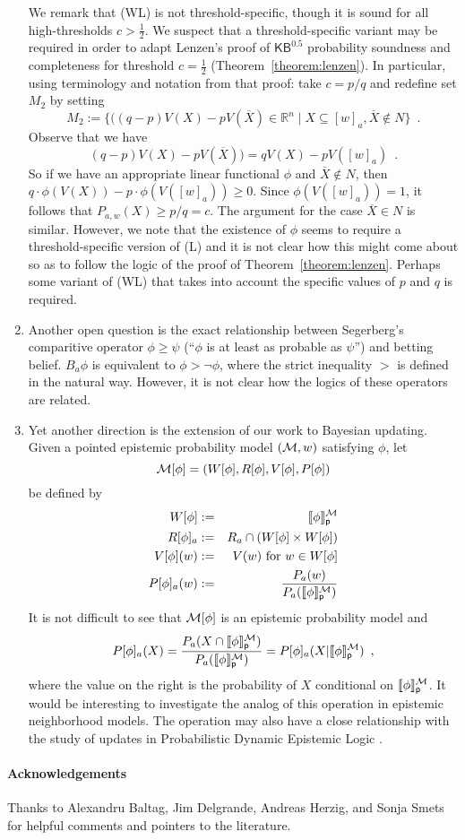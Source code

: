 \documentclass[12pt]{article}
\theoremstyle{definition}
\newcommand{\M}{{\cal M}}      %
\newcommand{\KBeq}{{\mathsf{KB}^{\mathsf{0.5}}}}       %
\newcommand{\semp}[1]{\llbracket{#1}\rrbracket_{\mathsf{p}}} %
\begin{document}
\begin{enumerate}
We remark that (WL) is not threshold-specific, though it is sound for
all high-thresholds $c>\frac 12$.  We suspect that a
threshold-specific variant may be required in order to adapt Lenzen's
proof of $\KBeq$ probability soundness and completeness for threshold
$c=\frac 12$ (Theorem~\ref{theorem:lenzen}).  In particular, using
terminology and notation from that proof: take $c=p/q$ and redefine
set $M_2$ by setting
\[
M_2:= \{((q-p) V(X)- p V(\overline X)\in\mathbb{R}^n\mid
X\subseteq[w]_a,\overline{X}\notin N\}\enspace.
\]
Observe that we have
\[
(q-p) V(X)- p V(\overline X)) =
qV(X)-pV([w]_a)\enspace.
\]
So if we have an appropriate linear functional $\phi$ and
$\overline{X}\notin N$, then
$q\cdot\phi(V(X))-p\cdot\phi(V([w]_a))\geq 0$.  Since
$\phi(V([w]_a))=1$, it follows that $P_{a,w}(X)\geq p/q=c$.  The
argument for the case $\overline{X}\in N$ is similar.  However, we
note that the existence of $\phi$ seems to require a
threshold-specific version of (L) and it is not clear how this might
come about so as to follow the logic of the proof of
Theorem~\ref{theorem:lenzen}.  Perhaps some variant of (WL) that takes
into account the specific values of $p$ and $q$ is required.

\item Another open question is the exact relationship between
  Segerberg's comparitive operator $\phi\geq\psi$ (``$\phi$ is at
  least as probable as $\psi$'') \cite{Segerberg1971:qpiams} and
  betting belief.  $B_a\phi$ is equivalent to $\phi>\lnot\phi$, where
  the strict inequality $>$ is defined in the natural way.  However,
  it is not clear how the logics of these operators are related.

\item Yet another direction is the extension of our work to Bayesian
  updating.  Given a pointed epistemic probability model $(\M,w)$
  satisfying $\phi$, let
\[
\M[\phi]=(W[\phi],R[\phi],V[\phi],P[\phi])
\]
be defined by
\begin{eqnarray*}
  W[\phi] &:=& \semp{\phi}^\M \\
  R[\phi]_a &:=& R_a \cap (W[\phi]\times W[\phi]) \\
  V[\phi](w) &:=& V(w) \text{ for } w\in W[\phi] \\
  P[\phi]_a(w) &:=&
    \frac{ P_a(w) }{ P_a(\semp{\phi}^\M) }
\end{eqnarray*}
It is not difficult to see that $\M[\phi]$ is an epistemic probability model and
\[
P[\phi]_a(X) =
\frac{ P_a(X\cap\semp{\phi}^\M) }{ P_a(\semp{\phi}^\M) } = 
P[\phi]_a(X|\semp{\phi}^\M)\enspace,
\]
where the value on the right is the probability of $X$ conditional on
$\semp{\phi}^\M$.  It would be interesting to investigate the analog
of this operation in epistemic neighborhood models.  The operation may
also have a close relationship with the study of updates in
Probabilistic Dynamic Epistemic Logic
\cite{BenGerKoo09:SL,BalSme08:Synt}.
\end{enumerate}

\paragraph{Acknowledgements} 

Thanks to Alexandru Baltag, Jim Delgrande, Andreas Herzig, and Sonja Smets for 
helpful comments and pointers to the literature. 


  
\end{document}

